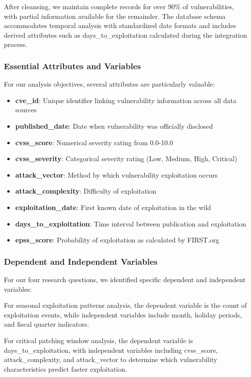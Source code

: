 \documentclass[runningheads]{llncs}
\begin{document}
After cleansing, we maintain complete records for over 90\% of vulnerabilities, with partial information available for the remainder. The database schema accommodates temporal analysis with standardized date formats and includes derived attributes such as days\_to\_exploitation calculated during the integration process.

\subsubsection{Essential Attributes and Variables}
For our analysis objectives, several attributes are particularly valuable:

\begin{itemize}
    \item \textbf{cve\_id}: Unique identifier linking vulnerability information across all data sources
    \item \textbf{published\_date}: Date when vulnerability was officially disclosed
    \item \textbf{cvss\_score}: Numerical severity rating from 0.0-10.0
    \item \textbf{cvss\_severity}: Categorical severity rating (Low, Medium, High, Critical)
    \item \textbf{attack\_vector}: Method by which vulnerability exploitation occurs
    \item \textbf{attack\_complexity}: Difficulty of exploitation
    \item \textbf{exploitation\_date}: First known date of exploitation in the wild
    \item \textbf{days\_to\_exploitation}: Time interval between publication and exploitation
    \item \textbf{epss\_score}: Probability of exploitation as calculated by FIRST.org
\end{itemize}

\subsubsection{Dependent and Independent Variables}
For our four research questions, we identified specific dependent and independent variables:

For seasonal exploitation patterns analysis, the dependent variable is the count of exploitation events, while independent variables include month, holiday periods, and fiscal quarter indicators.

For critical patching window analysis, the dependent variable is days\_to\_exploitation, with independent variables including cvss\_score, attack\_complexity, and attack\_vector to determine which vulnerability characteristics predict faster exploitation.
\end{document}
